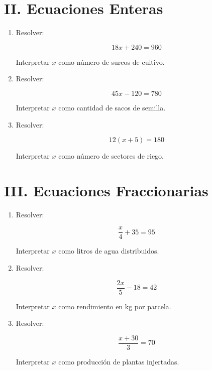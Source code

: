 \documentclass[12pt]{article}
\begin{document}
	\section*{II. Ecuaciones Enteras}
	
	\begin{enumerate}[label=\textbf{\arabic*.}, start=3]
		
		\item Resolver:
		
		\[
		18x + 240 = 960
		\]
		
		Interpretar \(x\) como número de surcos de cultivo.
		
		
		\item Resolver:
		
		\[
		45x - 120 = 780
		\]
		
		Interpretar \(x\) como cantidad de sacos de semilla.
		
		
		\item Resolver:
		
		\[
		12(x+5)=180
		\]
		
		Interpretar \(x\) como número de sectores de riego.
		
	\end{enumerate}
	
	\section*{III. Ecuaciones Fraccionarias}
	
	\begin{enumerate}[label=\textbf{\arabic*.}, start=6]
		
		\item Resolver:
		
		\[
		\frac{x}{4} + 35 = 95
		\]
		
		Interpretar \(x\) como litros de agua distribuidos.
		
		
		\item Resolver:
		
		\[
		\frac{2x}{5} - 18 = 42
		\]
		
		Interpretar \(x\) como rendimiento en kg por parcela.
		
		
		\item Resolver:
		
		\[
		\frac{x+30}{3}=70
		\]
		
		Interpretar \(x\) como producción de plantas injertadas.
		
	\end{enumerate}
	
\end{document}
